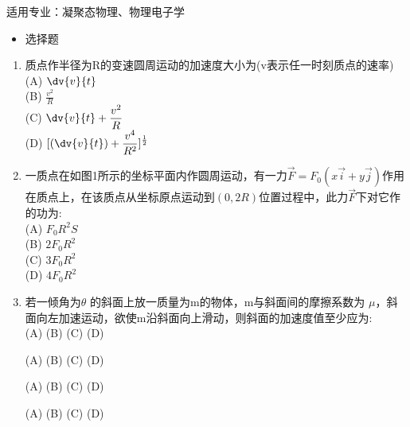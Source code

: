 适用专业：凝聚态物理、物理电子学
\begin{itemize}
\item 选择题
\end{itemize}
\begin{enumerate}
\item 质点作半径为R的变速圆周运动的加速度大小为(v表示任一时刻质点的速率)\\
(A) $\displaystyle \dv{v}{t}$\\
(B) $\displaystyle \frac{v^2}{R}$\\
(C) $\displaystyle \dv{v}{t}+\frac{v^2}{R}$\\
(D) $\displaystyle [(\dv{v}{t})+\frac{v^4}{R^2}]^\frac{1}{2}$
\item 一质点在如图1所示的坐标平面内作圆周运动，有一力$\vec F=F_0(x\vec i+y \vec j)$作用在质点上，在该质点从坐标原点运动到$(0,2R)$位置过程中，此力$\vec F$下对它作的功为:\\
(A) $F_0R^2S$\\
(B) $2F_0R^2$\\
(C) $3F_0R^2$\\
(D) $4F_0R^2$
\item 若一倾角为$\theta$ 的斜面上放一质量为m的物体，m与斜面间的摩擦系数为 $\mu$，斜面向左加速运动，欲使m沿斜面向上滑动，则斜面的加速度值至少应为:\\
(A) 
(B)
(C)
(D)

(A)
(B)
(C)
(D)


(A)
(B)
(C)
(D)


(A)
(B)
(C)
(D)
\end{enumerate}
